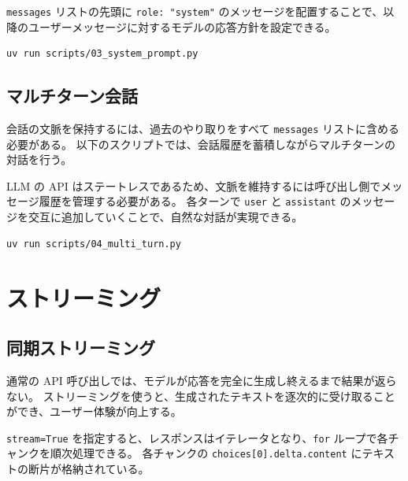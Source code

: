 \documentclass[a4paper,11pt]{ltjsarticle}
\newcommand{\code}[1]{\texttt{#1}}
\begin{document}
\code{messages} リストの先頭に \code{role: "system"} のメッセージを配置することで、以降のユーザーメッセージに対するモデルの応答方針を設定できる。

\begin{lstlisting}[style=bash]
uv run scripts/03_system_prompt.py
\end{lstlisting}

\subsection{マルチターン会話}
\label{subsec:multi_turn}

会話の文脈を保持するには、過去のやり取りをすべて \code{messages} リストに含める必要がある。
以下のスクリプトでは、会話履歴を蓄積しながらマルチターンの対話を行う。



LLM の API はステートレスであるため、文脈を維持するには呼び出し側でメッセージ履歴を管理する必要がある。
各ターンで \code{user} と \code{assistant} のメッセージを交互に追加していくことで、自然な対話が実現できる。

\begin{lstlisting}[style=bash]
uv run scripts/04_multi_turn.py
\end{lstlisting}


\section{ストリーミング}
\label{sec:streaming}

\subsection{同期ストリーミング}
\label{subsec:sync_stream}

通常の API 呼び出しでは、モデルが応答を完全に生成し終えるまで結果が返らない。
ストリーミングを使うと、生成されたテキストを逐次的に受け取ることができ、ユーザー体験が向上する。



\code{stream=True} を指定すると、レスポンスはイテレータとなり、\code{for} ループで各チャンクを順次処理できる。
各チャンクの \code{choices[0].delta.content} にテキストの断片が格納されている。
\end{document}
